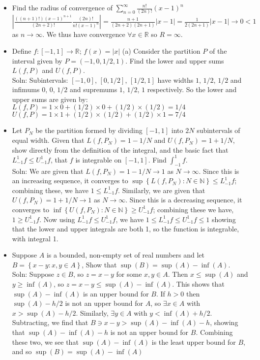 \documentclass[10pt]{article}
\begin{document}
\begin{multicols}{2}
\begin{itemize}
    \item Find the radius of convergence of $\sum^{\infty}_{n=0}\frac{n!}{(2n)!}(x-1)^{n}$\\
    $\left|\frac{((n+1)!)(x-1)^{n+1}}{(2n+2)!}\frac{(2n)!}{n!(x-1)^{n}}\right|=\frac{n+1}{(2n+2)(2n+1)}|x-1|=\frac{1}{2(2n+1)}|x-1|\to0<1$ as $n\to\infty$. We thus have convergence $\forall x\in\mathbb{R}$ so $R=\infty$.
    \item Define $f:[-1,1]\to\mathbb{R};\,f(x)=|x|$ (a) Consider the partition $P$ of the interval given by $P=(-1,0,1/2,1)$. Find the lower and upper sums $L(f,P)$ and $U(f,P)$.\\
    Soln: Subintervals: $[-1,0]$, $[0,1/2]$, $[1/2,1]$ have widths $1$, $1/2$, $1/2$ and infimums $0$, $0$, $1/2$ and supremums $1$, $1/2$, $1$ respectively. So the lower and upper sums are given by:\\
    $L(f,P)=1\times0+(1/2)\times0+(1/2)\times(1/2)=1/4$\\
    $U(f,P)=1\times1+(1/2)\times(1/2)+(1/2)\times1=7/4$
    \item Let $P_{N}$ be the partition formed by dividing $[-1,1]$ into $2N$ subintervals of equal width. Given that $L(f,P_{N})=1-1/N$ and $U(f,P_{N})=1+1/N$, show directly from the definition of the integral, and the basic fact that $L^{1}_{-1}f\leq U^{1}_{-1}f$, that $f$ is integrable on $[-1,1]$. Find $\int^{1}_{-1}f$.\\
    Soln: We are given that $L(f,P_{N})=1-1/N\to1$ as $N\to\infty$. Since this is an increasing sequence, it converges to $\sup\left\{L(f,P_{N}):N\in\mathbb{N}\right\}\leq L^{1}_{-1}f$; combining these, we have $1\leq L^{1}_{-1}f$. Similarly, we are given that $U(f,P_{N})=1+1/N\to1$ as $N\to\infty$. Since this is a decreasing sequence, it converges to $\inf\left\{U(f,P_{N}):N\in\mathbb{N}\right\}\geq U^{1}_{-1}f$; combining these we have, $1\geq U^{1}_{-1}f$. Now using $L^{1}_{-1}f\leq U^{1}_{-1}f$, we have $1\leq L^{1}_{-1}f\leq U^{1}_{-1}f\leq1$ showing that the lower and upper integrals are both 1, so the function is integrable, with integral 1.
    \item Suppose $A$ is a bounded, non-empty set of real numbers and let $B=\left\{x-y:x,y\in A\right\}$, Show that $\sup(B)=\sup(A)-\inf(A)$.\\
    Soln: Suppose $z\in B$, so $z=x-y$ for some $x,y\in A$. Then $x\leq\sup(A)$ and $y\geq\inf(A)$, so $z=x-y\leq\sup(A)-\inf(A)$. This shows that $\sup(A)-\inf(A)$ is an upper bound for $B$. If $h>0$ then $\sup(A)-h/2$ is not an upper bound for $A$, so $\exists x\in A$ with $x>\sup(A)-h/2$. Similarly, $\exists y\in A$ with $y<\inf(A)+h/2$. Subtracting, we find that $B\ni x-y>\sup(A)-\inf(A)-h$, showing that $\sup(A)-\inf(A)-h$ is not an upper bound for $B$. Combining these two, we see that $\sup(A)-\inf(A)$ is the least upper bound for $B$, and so $\sup(B)=\sup(A)-\inf(A)$

\end{itemize}
\end{multicols}
\end{document}
